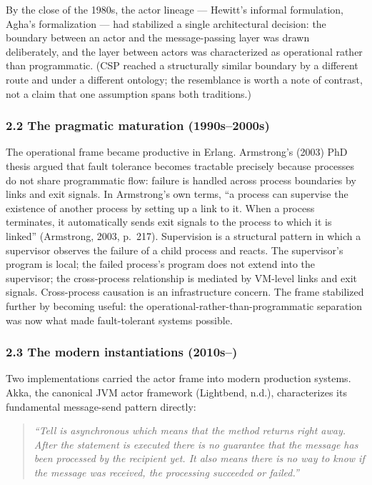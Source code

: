 \documentclass[
]{article}
\begin{document}
By the close of the 1980s, the actor lineage --- Hewitt's informal
formulation, Agha's formalization --- had stabilized a single
architectural decision: the boundary between an actor and the
message-passing layer was drawn deliberately, and the layer between
actors was characterized as operational rather than programmatic. (CSP
reached a structurally similar boundary by a different route and under a
different ontology; the resemblance is worth a note of contrast, not a
claim that one assumption spans both traditions.)

\subsubsection{2.2 The pragmatic maturation
(1990s--2000s)}\label{the-pragmatic-maturation-1990s2000s}

The operational frame became productive in Erlang. Armstrong's (2003)
PhD thesis argued that fault tolerance becomes tractable precisely
because processes do not share programmatic flow: failure is handled
across process boundaries by links and exit signals. In Armstrong's own
terms, ``a process can supervise the existence of another process by
setting up a link to it. When a process terminates, it automatically
sends exit signals to the process to which it is linked'' (Armstrong,
2003, p.~217). Supervision is a structural pattern in which a supervisor
observes the failure of a child process and reacts. The supervisor's
program is local; the failed process's program does not extend into the
supervisor; the cross-process relationship is mediated by VM-level links
and exit signals. Cross-process causation is an infrastructure concern.
The frame stabilized further by becoming useful: the
operational-rather-than-programmatic separation was now what made
fault-tolerant systems possible.

\subsubsection{2.3 The modern instantiations
(2010s--)}\label{the-modern-instantiations-2010s}

Two implementations carried the actor frame into modern production
systems. Akka, the canonical JVM actor framework (Lightbend, n.d.),
characterizes its fundamental message-send pattern directly:

\begin{quote}
\emph{``Tell is asynchronous which means that the method returns right
away. After the statement is executed there is no guarantee that the
message has been processed by the recipient yet. It also means there is
no way to know if the message was received, the processing succeeded or
failed.''}
\end{quote}
\end{document}
